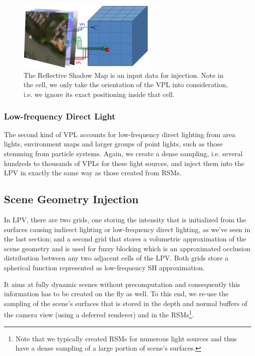 \begin{figure}
\begin{center}
	\includegraphics[width=0.6\textwidth]{graphics/lpv/lpv-4}
\end{center}
\caption{The Reflective Shadow Map is an input data for injection. Note in the cell, we only take the orientation of the VPL into consideration, i.e. we ignore its exact positioning inside that cell.}
\end{figure}




\subsubsection{Low-frequency Direct Light}
The second kind of VPL accounts for low-frequency direct lighting from area lights, environment maps and larger groups of point lights, such as those stemming from particle systems. Again, we create a dense sampling, i.e. several hundreds to thousands of VPLs for these light sources, and inject them into the LPV in exactly the same way as those created from RSMs.




\subsection{Scene Geometry Injection}
In LPV, there are two grids, one storing the intensity that is initialized from the surfaces causing indirect lighting or low-frequency direct lighting, as we've seen in the last section; and a second grid that stores a volumetric approximation of the scene geometry and is used for fuzzy blocking which is an approximated occlusion distribution between any two adjacent cells of the LPV. Both grids store a spherical function represented as low-frequency SH approximation.

It aims at fully dynamic scenes without precomputation and consequently this information has to be created on the fly as well. To this end, we re-use the sampling of the scene's surfaces that is stored in the depth and normal buffers of the camera view (using a deferred renderer) and in the RSMs\footnote{Note that we typically created RSMs for numerous light sources and thus have a dense sampling of a large portion of scene's surfaces.}.


